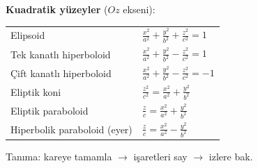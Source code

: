 \begin{ozet}
\textbf{Kuadratik yüzeyler} ($Oz$ ekseni):
\begin{center}
\begin{tabular}{l l}
\toprule
Elipsoid & $\frac{x^2}{a^2}+\frac{y^2}{b^2}+\frac{z^2}{c^2}=1$\\
Tek kanatlı hiperboloid & $\frac{x^2}{a^2}+\frac{y^2}{b^2}-\frac{z^2}{c^2}=1$\\
Çift kanatlı hiperboloid & $\frac{x^2}{a^2}+\frac{y^2}{b^2}-\frac{z^2}{c^2}=-1$\\
Eliptik koni & $\frac{z^2}{c^2}=\frac{x^2}{a^2}+\frac{y^2}{b^2}$\\
Eliptik paraboloid & $\frac zc=\frac{x^2}{a^2}+\frac{y^2}{b^2}$\\
Hiperbolik paraboloid (eyer) & $\frac zc=\frac{x^2}{a^2}-\frac{y^2}{b^2}$\\
\bottomrule
\end{tabular}
\end{center}
Tanıma: kareye tamamla $\to$ işaretleri say $\to$ izlere bak.
\end{ozet}
